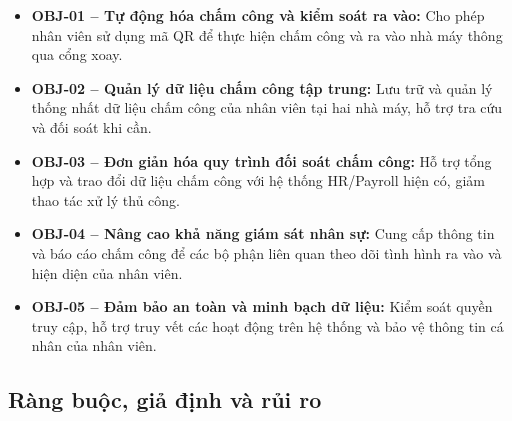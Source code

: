\begin{itemize}
\item \textbf{OBJ-01 -- Tự động hóa chấm công và kiểm soát ra vào:} Cho phép nhân viên sử dụng mã QR để thực hiện chấm công và ra vào nhà máy thông qua cổng xoay.
\item \textbf{OBJ-02 -- Quản lý dữ liệu chấm công tập trung:} Lưu trữ và quản lý thống nhất dữ liệu chấm công của nhân viên tại hai nhà máy, hỗ trợ tra cứu và đối soát khi cần.
\item \textbf{OBJ-03 -- Đơn giản hóa quy trình đối soát chấm công:} Hỗ trợ tổng hợp và trao đổi dữ liệu chấm công với hệ thống HR/Payroll hiện có, giảm thao tác xử lý thủ công.
\item \textbf{OBJ-04 -- Nâng cao khả năng giám sát nhân sự:} Cung cấp thông tin và báo cáo chấm công để các bộ phận liên quan theo dõi tình hình ra vào và hiện diện của nhân viên.
\item \textbf{OBJ-05 -- Đảm bảo an toàn và minh bạch dữ liệu:} Kiểm soát quyền truy cập, hỗ trợ truy vết các hoạt động trên hệ thống và bảo vệ thông tin cá nhân của nhân viên.
\end{itemize}

\subsection{Ràng buộc, giả định và rủi ro}

